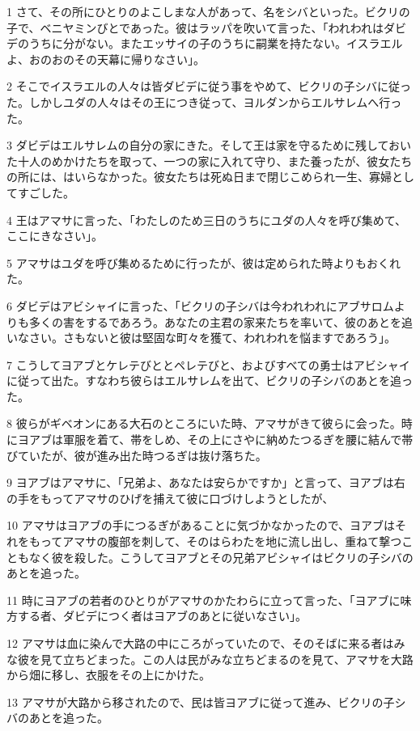 \par 1 さて、その所にひとりのよこしまな人があって、名をシバといった。ビクリの子で、ベニヤミンびとであった。彼はラッパを吹いて言った、「われわれはダビデのうちに分がない。またエッサイの子のうちに嗣業を持たない。イスラエルよ、おのおのその天幕に帰りなさい」。
\par 2 そこでイスラエルの人々は皆ダビデに従う事をやめて、ビクリの子シバに従った。しかしユダの人々はその王につき従って、ヨルダンからエルサレムへ行った。
\par 3 ダビデはエルサレムの自分の家にきた。そして王は家を守るために残しておいた十人のめかけたちを取って、一つの家に入れて守り、また養ったが、彼女たちの所には、はいらなかった。彼女たちは死ぬ日まで閉じこめられ一生、寡婦としてすごした。
\par 4 王はアマサに言った、「わたしのため三日のうちにユダの人々を呼び集めて、ここにきなさい」。
\par 5 アマサはユダを呼び集めるために行ったが、彼は定められた時よりもおくれた。
\par 6 ダビデはアビシャイに言った、「ビクリの子シバは今われわれにアブサロムよりも多くの害をするであろう。あなたの主君の家来たちを率いて、彼のあとを追いなさい。さもないと彼は堅固な町々を獲て、われわれを悩ますであろう」。
\par 7 こうしてヨアブとケレテびととペレテびと、およびすべての勇士はアビシャイに従って出た。すなわち彼らはエルサレムを出て、ビクリの子シバのあとを追った。
\par 8 彼らがギベオンにある大石のところにいた時、アマサがきて彼らに会った。時にヨアブは軍服を着て、帯をしめ、その上にさやに納めたつるぎを腰に結んで帯びていたが、彼が進み出た時つるぎは抜け落ちた。
\par 9 ヨアブはアマサに、「兄弟よ、あなたは安らかですか」と言って、ヨアブは右の手をもってアマサのひげを捕えて彼に口づけしようとしたが、
\par 10 アマサはヨアブの手につるぎがあることに気づかなかったので、ヨアブはそれをもってアマサの腹部を刺して、そのはらわたを地に流し出し、重ねて撃つこともなく彼を殺した。こうしてヨアブとその兄弟アビシャイはビクリの子シバのあとを追った。
\par 11 時にヨアブの若者のひとりがアマサのかたわらに立って言った、「ヨアブに味方する者、ダビデにつく者はヨアブのあとに従いなさい」。
\par 12 アマサは血に染んで大路の中にころがっていたので、そのそばに来る者はみな彼を見て立ちどまった。この人は民がみな立ちどまるのを見て、アマサを大路から畑に移し、衣服をその上にかけた。
\par 13 アマサが大路から移されたので、民は皆ヨアブに従って進み、ビクリの子シバのあとを追った。
